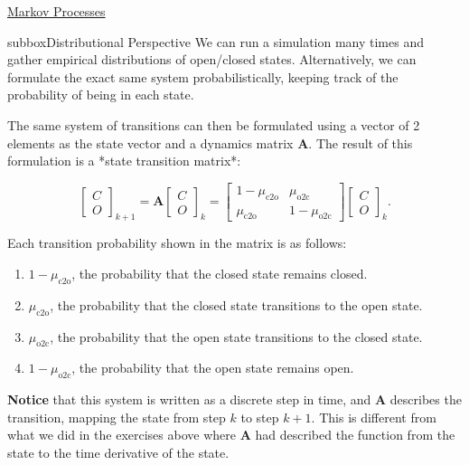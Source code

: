 \begin{textbox}{\href{https://colab.research.google.com/github/NeuromatchAcademy/course-content/blob/master/tutorials/W2D2_LinearSystems/student/W2D2_Tutorial2.ipynb}{Markov Processes } }
\begin{subbox}{subbox}{Distributional Perspective}
\scriptsize
We can run a simulation many times and gather empirical distributions of open/closed states. Alternatively, we can formulate the exact same system probabilistically, keeping track of the probability of being in each state.

The same system of transitions can then be formulated using a vector of 2 elements as the state vector and a dynamics matrix $\mathbf{A}$. The result of this formulation is a *state transition matrix*:

\[\left[ \begin{array}{c} C \\ O \end{array} \right]_{k+1} = \mathbf{A} \left[ \begin{array}{c} C \\ O \end{array} \right]_k = \left[ \begin{matrix} 1-\mu_{\text{c2o}} & \mu_{\text{o2c}} \\ \mu_{\text{c2o}} & 1-\mu_{\text{o2c}} \end{matrix} \right] \left[ \begin{array}{c} C \\ O \end{array} \right]_k.\]


Each transition probability shown in the matrix is as follows:
\begin{enumerate}
    \item 
 $1-\mu_{\text{c2o}}$, the probability that the closed state remains closed. 
\item $\mu_{\text{c2o}}$, the probability that the closed state transitions to the open state.
\item  $\mu_{\text{o2c}}$, the probability that the open state transitions to the closed state. 
\item $1-\mu_{\text{o2c}}$, the probability that the open state remains open. 
\end{enumerate}



\textbf{Notice} that this system is written as a discrete step in time, and $\mathbf{A}$ describes the transition, mapping the state from step $k$ to step $k+1$. This is different from what we did in the exercises above where $\mathbf{A}$ had described the function from the state to the time derivative of the state.


\end{subbox}
\end{textbox}
